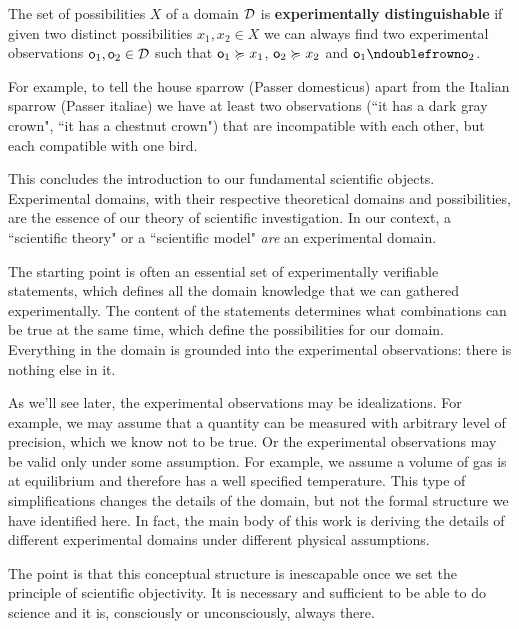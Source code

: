\documentclass[11pt,letterpaper,fleqn]{memoir} %
\begin{document}
\begin{mathSection}
\begin{defn}
	The set of possibilities $X$ of a domain $\mathcal{D}$ is \textbf{experimentally distinguishable} if given two distinct possibilities $x_1, x_2 \in X$ we can always find two experimental observations $\textsf{o}_1, \textsf{o}_2 \in \mathcal{D}$ such that $\textsf{o}_1 \succcurlyeq x_1$, $\textsf{o}_2 \succcurlyeq x_2$ and $\textsf{o}_1 \ncomp \textsf{o}_2$.
\end{defn}
\end{mathSection}

For example, to tell the house sparrow (Passer domesticus) apart from the Italian sparrow (Passer italiae) we have at least two observations (``it has a dark gray crown", ``it has a chestnut crown") that are incompatible with each other, but each compatible with one bird.

This concludes the introduction to our fundamental scientific objects. Experimental domains, with their respective theoretical domains and possibilities, are the essence of our theory of scientific investigation. In our context, a ``scientific theory" or a ``scientific model" \emph{are} an experimental domain.


The starting point is often an essential set of experimentally verifiable statements, which defines all the domain knowledge that we can gathered experimentally. The content of the statements determines what combinations can be true at the same time, which define the possibilities for our domain. Everything in the domain is grounded into the experimental observations: there is nothing else in it.

As we'll see later, the experimental observations may be idealizations. For example, we may assume that a quantity can be measured with arbitrary level of precision, which we know not to be true. Or the experimental observations may be valid only under some assumption. For example, we assume a volume of gas is at equilibrium and therefore has a well specified temperature. This type of simplifications changes the details of the domain, but not the formal structure we have identified here. In fact, the main body of this work is deriving the details of different experimental domains under different physical assumptions.

The point is that this conceptual structure is inescapable once we set the principle of scientific objectivity. It is necessary and sufficient to be able to do science and it is, consciously or unconsciously, always there.
\end{document}

